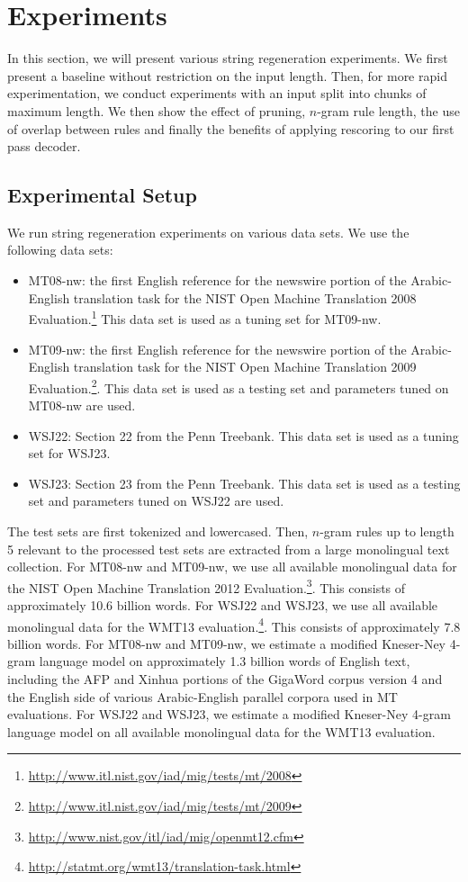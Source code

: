 \section{Experiments}

In this section, we will present various
string regeneration experiments.  We first present
a baseline without restriction on the input length.
Then, for more rapid experimentation, we conduct
experiments with an input split into chunks of maximum length.
We then show the effect of pruning, $n$-gram rule
length, the use of overlap between rules and finally
the benefits of applying rescoring to our first
pass decoder.

\subsection{Experimental Setup}

We run string regeneration experiments on various
data sets. We use the following data sets:
%
\begin{itemize}
  \item MT08-nw: the first English reference for the newswire portion of the
    Arabic-English translation task for the NIST Open Machine Translation 2008
    Evaluation.\footnote{\url{http://www.itl.nist.gov/iad/mig/tests/mt/2008}}
    This data set is used as a tuning set for MT09-nw.
  \item MT09-nw: the first English reference for the newswire portion of the
    Arabic-English translation task for the NIST Open Machine Translation 2009
    Evaluation.\footnote{\url{http://www.itl.nist.gov/iad/mig/tests/mt/2009}}.
    This data set is used as a testing set and parameters tuned on MT08-nw are used.
  \item WSJ22: Section 22 from the Penn Treebank. This data set is used
    as a tuning set for WSJ23.
  \item WSJ23: Section 23 from the Penn Treebank. This data set is used as a
    testing set and parameters tuned on WSJ22 are used.
\end{itemize}
%
The test sets are first tokenized and lowercased.
Then, $n$-gram rules up to length 5 relevant to the processed test sets
are extracted from a large monolingual text collection.
For MT08-nw and MT09-nw, we use all available monolingual data
for the NIST Open Machine Translation 2012
Evaluation.\footnote{\url{http://www.nist.gov/itl/iad/mig/openmt12.cfm}}.
This consists of approximately 10.6 billion words.
For WSJ22 and WSJ23, we use all available monolingual data for the WMT13
evaluation.\footnote{\url{http://statmt.org/wmt13/translation-task.html}}.
This consists of approximately 7.8 billion words.
For MT08-nw and MT09-nw, we estimate a modified Kneser-Ney 4-gram language model
on approximately 1.3 billion words of English text, including
the AFP and Xinhua portions of the GigaWord corpus
version 4 and the English side of various Arabic-English
parallel corpora used in MT evaluations. For WSJ22 and WSJ23, we
estimate a modified Kneser-Ney 4-gram language model on all available
monolingual data for the WMT13 evaluation.

